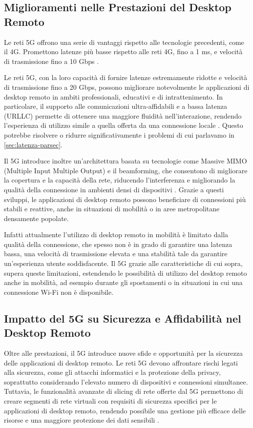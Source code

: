 \documentclass[12pt,a4paper,openright,twoside]{book}
\begin{document}
\subsection{Miglioramenti nelle Prestazioni del Desktop Remoto}

Le reti 5G offrono una serie di vantaggi rispetto alle tecnologie precedenti, come il 4G. Promettono latenze più basse rispetto alle reti 4G, fino a 1 ms, e velocità di trasmissione fino a 10 Gbps \cite{Dangi2021}. 

Le reti 5G, con la loro capacità di fornire latenze estremamente ridotte e velocità di trasmissione fino a 20 Gbps, possono migliorare notevolmente le applicazioni di desktop remoto in ambiti professionali, educativi e di intrattenimento. In particolare, il supporto alle comunicazioni ultra-affidabili e a bassa latenza (URLLC) permette di ottenere una maggiore fluidità nell’interazione, rendendo l’esperienza di utilizzo simile a quella offerta da una connessione locale \cite{Dangi2021, Sahu2024}. Questo potrebbe risolvere o ridurre significativamente i problemi di cui parlavamo in \ref{sec:latenza-parsec}.

Il 5G introduce inoltre un'architettura basata su tecnologie come Massive MIMO (Multiple Input Multiple Output) e il beamforming, che consentono di migliorare la copertura e la capacità della rete, riducendo l'interferenza e migliorando la qualità della connessione in ambienti densi di dispositivi \cite{Dangi2021}. Grazie a questi sviluppi, le applicazioni di desktop remoto possono beneficiare di connessioni più stabili e reattive, anche in situazioni di mobilità o in aree metropolitane densamente popolate.

Infatti attualmente l'utilizzo di desktop remoto in mobilità è limitato dalla qualità della connessione, che spesso non è in grado di garantire una latenza bassa, una velocità di trasmissione elevata e una stabilità tale da garantire un'esperienza utente soddisfacente. Il 5G grazie alle caratteristiche di cui sopra, supera queste limitazioni, estendendo le possibilità di utilizzo del desktop remoto anche in mobilità, ad esempio durante gli spostamenti o in situazioni in cui una connessione Wi-Fi non è disponibile.

\subsection{Impatto del 5G su Sicurezza e Affidabilità nel Desktop Remoto}

Oltre alle prestazioni, il 5G introduce nuove sfide e opportunità per la sicurezza delle applicazioni di desktop remoto. Le reti 5G devono affrontare rischi legati alla sicurezza, come gli attacchi informatici e la protezione della privacy, soprattutto considerando l’elevato numero di dispositivi e connessioni simultanee. Tuttavia, le funzionalità avanzate di slicing di rete offerte dal 5G permettono di creare segmenti di rete virtuali con requisiti di sicurezza specifici per le applicazioni di desktop remoto, rendendo possibile una gestione più efficace delle risorse e una maggiore protezione dei dati sensibili \cite{Dangi2021}.
\end{document}
